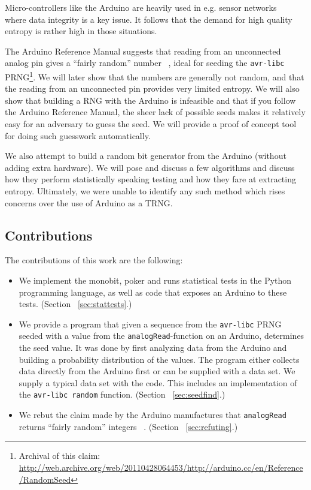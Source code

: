 \documentclass[a4paper]{article}           %
\begin{document}
Micro-controllers like the Arduino are heavily used in e.g. sensor networks ~\cite{tsense} where data integrity is a key issue. It follows that the demand for high quality entropy is rather high in those situations. 

The Arduino Reference Manual suggests that reading from an unconnected analog pin gives a ``fairly random'' number ~\cite{ardref}, ideal for seeding the \texttt{avr-libc} PRNG\footnote{Archival of this claim: \url{http://web.archive.org/web/20110428064453/http://arduino.cc/en/Reference/RandomSeed}}. We will later show that the numbers are generally not random, and that the reading from an unconnected pin provides very limited entropy. We will also show that building a RNG with the Arduino is infeasible and that if you follow the Arduino Reference Manual, the sheer lack of possible seeds makes it relatively easy for an adversary to guess the seed. We will provide a proof of concept tool for doing such guesswork automatically. 

We also attempt to build a random bit generator from the Arduino (without adding extra hardware). We will pose and discuss a few algorithms and discuss how they perform statistically speaking testing and how they fare at extracting entropy. Ultimately, we were unable to identify any such method which rises concerns over the use of Arduino as a TRNG. 

\subsection{Contributions}

The contributions of this work are the following:

\begin{itemize}
\item We implement the monobit, poker and runs statistical tests in the Python programming language, as well as code that exposes an Arduino to these tests. (Section ~\ref{sec:stattests}.)
\item We provide a program that given a sequence from the \texttt{avr-libc} PRNG seeded with a value from the \texttt{analogRead}-function on an Arduino, determines the seed value. It was done by first analyzing data from the Arduino and building a probability distribution of the values. The program either collects data directly from the Arduino first or can be supplied with a data set. We supply a typical data set with the code. This includes an implementation of the \texttt{avr-libc random} function. (Section ~\ref{sec:seedfind}.)
\item We rebut the claim made by the Arduino manufactures that \texttt{analogRead} returns ``fairly random'' integers ~\cite{ardref}. (Section ~\ref{sec:refuting}.)

\end{itemize}
\end{document}
